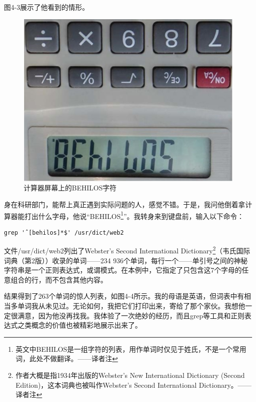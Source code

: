 \documentclass[a4paper,12pt,UTF8,twoside]{ctexbook}
\begin{document}
图4-3展示了他看到的情形。

\begin{figure}[htbp]
	\centering
	\includegraphics[width=0.7\linewidth]{36}
	\caption{计算器屏幕上的BEHILOS字符}
	\label{fig:1}
\end{figure}

身在科研部门，能帮上真正遇到实际问题的人，感觉不错。于是，我问他倒着拿计算器能打出什么字母，他说“BEHILOS\footnote{英文中BEHILOS是一组字符的列表，用作单词时仅见于姓氏，不是一个常用词，此处不做翻译。——译者注}”。我转身来到键盘前，输入以下命令：

\begin{lstlisting}
grep 'ˆ[behilos]*$' /usr/dict/web2
\end{lstlisting}

文件/usr/dict/web2列出了Webster’s Second International Dictionary\footnote{作者大概是指1934年出版的Webster’s New International Dictionary (Second Edition)，这本词典也被叫作Webster’s Second International Dictionary。——译者注}（韦氏国际词典（第2版））收录的单词——234 936个单词，每行一个——单引号之间的神秘字符串是一个正则表达式，或谓模式。在本例中，它指定了只包含这7个字母的任意组合的行，而不包含其他内容。

结果得到了263个单词的惊人列表，如图4-4所示。我的母语是英语，但词表中有相当多单词我从未见过。无论如何，我把它们打印出来，寄给了那个家伙。我想他一定很满意，因为他没再找我。我体验了一次绝妙的经历，而且grep等工具和正则表达式之类概念的价值也被精彩地展示出来了。
\end{document}
